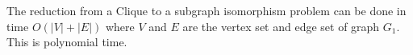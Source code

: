 \documentclass[paper=a4, fontsize=11pt]{scrartcl} %
\numberwithin{equation}{section} %
\numberwithin{figure}{section} %
\numberwithin{table}{section} %
\begin{document}
\begin{enumerate}
The reduction from a Clique to a subgraph isomorphism problem can be done in time $O(\left | V \right | + \left | E \right| )$ where $V$ and $E$ are the vertex set and edge set of graph $G_1$. This is polynomial time.

\end{enumerate}

\end{document}
